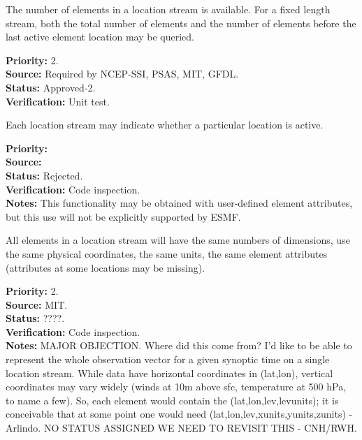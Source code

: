The number of elements in a location stream is available.  For a fixed length stream,
both the total number of elements and the number of elements before the last
active element location may be queried.
\begin{reqlist}
{\bf Priority:} 2. \\
{\bf Source:} Required by NCEP-SSI, PSAS, MIT, GFDL.\\
{\bf Status:} Approved-2. \\
{\bf Verification:} Unit test. 
\end{reqlist}

Each location stream may indicate whether a particular location is active.

\begin{reqlist}
{\bf Priority:} \\
{\bf Source:} \\
{\bf Status:} Rejected. \\
{\bf Verification:} Code inspection. \\
{\bf Notes:} This functionality may be obtained with user-defined element
attributes, but this use will not be explicitly supported by ESMF.
\end{reqlist}


All elements in a location stream will have the same numbers of dimensions, use the
same physical coordinates, the same units, the same element attributes (attributes at
some locations may be missing).
\begin{reqlist}
{\bf Priority:} 2. \\
{\bf Source:} MIT. \\
{\bf Status:} ????. \\
{\bf Verification:} Code inspection. \\
{\bf Notes:} MAJOR OBJECTION. Where did this come from? I'd like to be able to represent the whole observation vector for a given synoptic time on a single location stream. While data have horizontal coordinates in (lat,lon), vertical coordinates may vary widely (winds at 10m above sfc, temperature at 500 hPa, to name a few). So, each element would contain the (lat,lon,lev,levunits); it is conceivable that at  some point one would need (lat,lon,lev,xunits,yunits,zunits) - Arlindo.
NO STATUS ASSIGNED WE NEED TO REVISIT THIS - CNH/RWH.
\end{reqlist}


